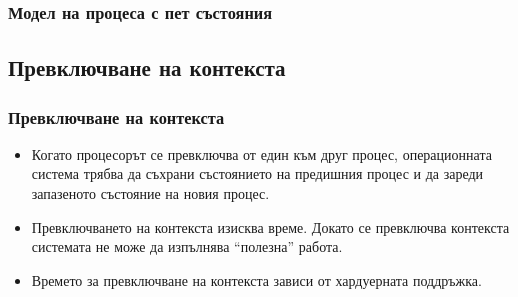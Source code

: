 \documentclass[ignorenonframetext, hyperref=unicode]{beamer}
\begin{document}
\begin{frame}\frametitle{Модел на процеса с пет състояния}
\begin{figure}[h]
\center
{}
\end{figure}
\end{frame}

\subsection{Превключване на контекста}

\begin{frame}\frametitle{Превключване на контекста}
\begin{itemize}
\item Когато процесорът се превключва от един към друг процес, операционната
система трябва да съхрани състоянието на предишния процес и да зареди запазеното
състояние на новия процес.
\item Превключването на контекста изисква време. Докато се превключва
контекста системата не може да изпълнява ``полезна'' работа.
\item Времето за превключване на контекста зависи от хардуерната поддръжка.
\end{itemize}
\end{frame}
\end{document}

